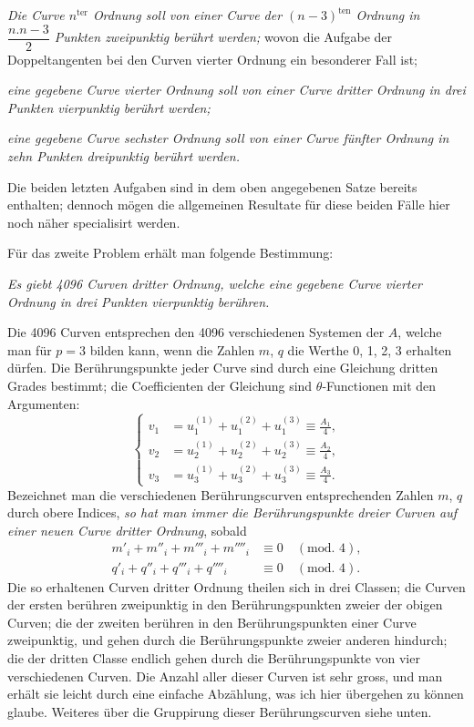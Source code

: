 \documentclass{article}
\begin{document}
\emph{Die Curve $n^{\text{ter}}$ Ordnung soll von einer Curve der $(n-3)^{\text{ten}}$ Ordnung in $\dfrac{n.n-3}{2}$ Punkten zweipunktig berührt werden;}
wovon die Aufgabe der Doppeltangenten bei den Curven vierter Ordnung ein besonderer Fall ist;

\emph{eine gegebene Curve vierter Ordnung soll von einer Curve dritter Ordnung in drei Punkten vierpunktig berührt werden;}

\emph{eine gegebene Curve sechster Ordnung soll von einer Curve fünfter Ordnung in zehn Punkten dreipunktig berührt werden.}

Die beiden letzten Aufgaben sind in dem oben angegebenen Satze bereits enthalten; dennoch mögen die allgemeinen Resultate für diese beiden Fälle hier noch näher specialisirt werden.

Für das zweite Problem erhält man folgende Bestimmung:

\emph{Es giebt 4096 Curven dritter Ordnung, welche eine gegebene Curve vierter Ordnung in drei Punkten vierpunktig berühren.}

Die 4096 Curven entsprechen den 4096 verschiedenen Systemen der $A$, welche man für $p = 3$ bilden kann, wenn die Zahlen $m$, $q$ die Werthe 0, 1, 2, 3 erhalten dürfen. Die Berührungspunkte jeder Curve sind durch eine Gleichung dritten Grades bestimmt; die Coefficienten der Gleichung sind $\theta$-Functionen mit den Argumenten:
\[
\left\{
\begin{aligned}
v_{1} &= u_{1}^{(1)} + u_{1}^{(2)} + u_{1}^{(3)} \equiv \frac{A_{1}}{4}, \\
v_{2} &= u_{2}^{(1)} + u_{2}^{(2)} + u_{2}^{(3)} \equiv \frac{A_{2}}{4}, \\
v_{3} &= u_{3}^{(1)} + u_{3}^{(2)} + u_{3}^{(3)} \equiv \frac{A_{3}}{4}.
\end{aligned}
\right.
\tag{10.}
\]
Bezeichnet man die verschiedenen Berührungscurven entsprechenden Zahlen $m$, $q$ durch obere Indices, \emph{so hat man immer die Berührungspunkte dreier Curven auf einer neuen Curve dritter Ordnung}, sobald
\[
\begin{aligned}
m'_{i} + m''_{i} + m'''_{i} + m''''_{i} &\equiv 0 \quad (\text{mod. } 4), \\
q'_{i} + q''_{i} + q'''_{i} + q''''_{i} &\equiv 0 \quad (\text{mod. } 4).
\end{aligned}
\]
Die so erhaltenen Curven dritter Ordnung theilen sich in drei Classen; die Curven der ersten berühren zweipunktig in den Berührungspunkten zweier der obigen Curven; die der zweiten berühren in den Berührungspunkten einer Curve zweipunktig, und gehen durch die Berührungspunkte zweier anderen hindurch; die der dritten Classe endlich gehen durch die Berührungspunkte von vier verschiedenen Curven. Die Anzahl aller dieser Curven ist sehr gross, und man erhält sie leicht durch eine einfache Abzählung, was ich hier übergehen zu können glaube. Weiteres über die Gruppirung dieser Berührungscurven siehe unten.
\end{document}
